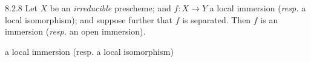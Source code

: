 \documentclass[../main.tex]{subfiles}
\begin{document}
\begin{cx}[Proposition]{8.2.8}
    Let $X$ be an \emph{irreducible} prescheme; and $f\colon X\to Y$ a local immersion (\emph{resp.} a local isomorphism); and suppose further that $f$ is separated.
    Then $f$ is an immersion (\emph{resp.} an open immersion).
\end{cx}

a local immersion (resp. a local isomorphism)

\end{document}
